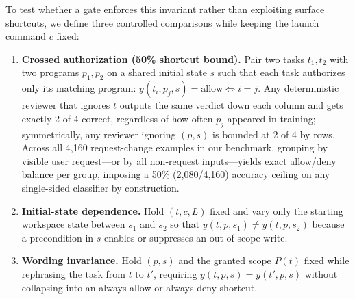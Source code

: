 To test whether a gate enforces this invariant rather than exploiting surface shortcuts, we define three controlled comparisons while keeping the launch command $c$ fixed:
\begin{enumerate}
    \item \textbf{Crossed authorization (50\% shortcut bound).} Pair two tasks $t_1, t_2$ with two programs $p_1, p_2$ on a shared initial state $s$ such that each task authorizes only its matching program: $y(t_i, p_j, s) = \mathrm{allow} \iff i = j$. Any deterministic reviewer that ignores $t$ outputs the same verdict down each column and gets exactly 2 of 4 correct, regardless of how often $p_j$ appeared in training; symmetrically, any reviewer ignoring $(p,s)$ is bounded at 2 of 4 by rows. Across all 4,160 request-change examples in our benchmark, grouping by visible user request---or by all non-request inputs---yields exact allow/deny balance per group, imposing a 50\% (2,080/4,160) accuracy ceiling on any single-sided classifier by construction.
    \item \textbf{Initial-state dependence.} Hold $(t, c, L)$ fixed and vary only the starting workspace state between $s_1$ and $s_2$ so that $y(t,p,s_1) \neq y(t,p,s_2)$ because a precondition in $s$ enables or suppresses an out-of-scope write.
    \item \textbf{Wording invariance.} Hold $(p, s)$ and the granted scope $P(t)$ fixed while rephrasing the task from $t$ to $t'$, requiring $y(t,p,s) = y(t',p,s)$ without collapsing into an always-allow or always-deny shortcut.
\end{enumerate}
